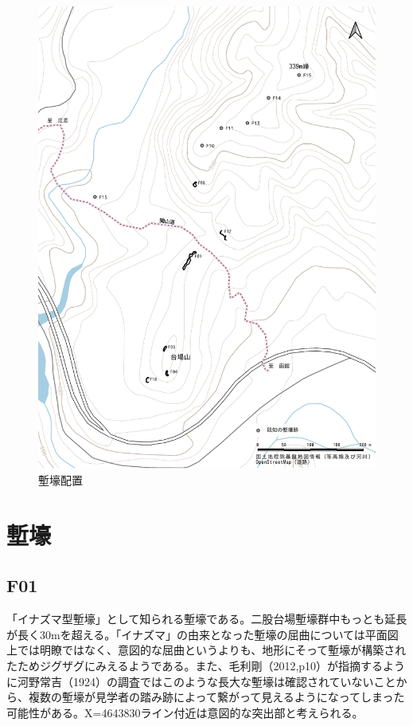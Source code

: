 \documentclass[14Q]{jsarticle}
\begin{document}
\begin{figure}[h]
\centering
\includegraphics[width=160truemm]{fig/haitizu_tate.pdf}
\caption{塹壕配置}
\label{haiti_tate}
\end{figure}

\section{塹壕}
\subsection{F01}
「イナズマ型塹壕」として知られる塹壕である。二股台場塹壕群中もっとも延長が長く30mを超える。「イナズマ」の由来となった塹壕の屈曲については平面図上では明瞭ではなく、意図的な屈曲というよりも、地形にそって塹壕が構築されたためジグザグにみえるようである。また、毛利剛（2012,p10）が指摘するように河野常吉（1924）の調査ではこのような長大な塹壕は確認されていないことから、複数の塹壕が見学者の踏み跡によって繋がって見えるようになってしまった可能性がある。X=4643830ライン付近は意図的な突出部と考えられる。
\end{document}
